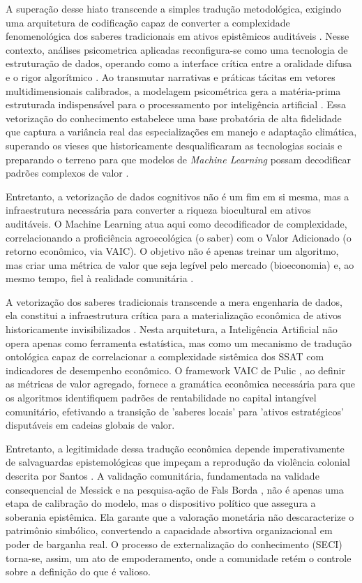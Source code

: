 A superação desse hiato transcende a simples tradução metodológica, exigindo uma arquitetura de codificação capaz de converter a complexidade fenomenológica dos saberes tradicionais em ativos epistêmicos auditáveis \cite{Boyd2020}. Nesse contexto, análises psicometrica aplicadas reconfigura-se como uma tecnologia de estruturação de dados, operando como a interface crítica entre a oralidade difusa e o rigor algorítmico \cite{McCrae2019}. Ao transmutar narrativas e práticas tácitas em vetores multidimensionais calibrados, a modelagem psicométrica gera a matéria-prima estruturada indispensável para o processamento por inteligência artificial \cite{Bengio2021}. Essa vetorização do conhecimento estabelece uma base probatória de alta fidelidade que captura a variância real das especializações em manejo e adaptação climática, superando os vieses que historicamente desqualificaram as tecnologias sociais e preparando o terreno para que modelos de \textit{Machine Learning} possam decodificar padrões complexos de valor \cite{Valdez2022}.

Entretanto, a vetorização de dados cognitivos não é um fim em si mesma, mas a infraestrutura necessária para converter a riqueza biocultural em ativos auditáveis. O Machine Learning atua aqui como decodificador de complexidade, correlacionando a proficiência agroecológica (o saber) com o Valor Adicionado (o retorno econômico, via VAIC). O objetivo não é apenas treinar um algoritmo, mas criar uma métrica de valor que seja legível pelo mercado (bioeconomia) e, ao mesmo tempo, fiel à realidade comunitária \cite{HosseiniyanKhatibip}. 

A vetorização dos saberes tradicionais transcende a mera engenharia de dados, ela constitui a infraestrutura crítica para a materialização econômica de ativos historicamente invisibilizados \cite{Hasani2020}. Nesta arquitetura, a Inteligência Artificial não opera apenas como ferramenta estatística, mas como um mecanismo de tradução ontológica capaz de correlacionar a complexidade sistêmica dos SSAT com indicadores de desempenho econômico. O framework VAIC de Pulic \cite{Pulic2000IC}, ao definir as métricas de valor agregado, fornece a gramática econômica necessária para que os algoritmos identifiquem padrões de rentabilidade no capital intangível comunitário, efetivando a transição de 'saberes locais' para 'ativos estratégicos' disputáveis em cadeias globais de valor.

Entretanto, a legitimidade dessa tradução econômica depende imperativamente de salvaguardas epistemológicas que impeçam a reprodução da violência colonial descrita por Santos \cite{Santos2007}. A validação comunitária, fundamentada na validade consequencial de Messick \cite{Messick1995} e na pesquisa-ação de Fals Borda \cite{FalsBorda1991}, não é apenas uma etapa de calibração do modelo, mas o dispositivo político que assegura a soberania epistêmica. Ela garante que a valoração monetária não descaracterize o patrimônio simbólico, convertendo a capacidade absortiva organizacional \cite{CohenLevinthal1990} em poder de barganha real. O processo de externalização do conhecimento (SECI) \cite{Nonaka1995} torna-se, assim, um ato de empoderamento, onde a comunidade retém o controle sobre a definição do que é valioso.

